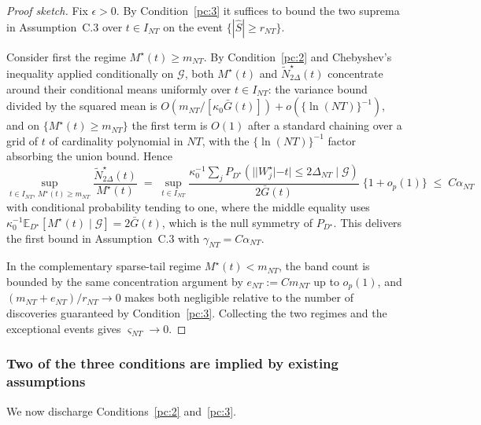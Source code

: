 \begin{proof}[Proof sketch]
Fix $\epsilon > 0$.  By Condition~\ref{pc:3} it suffices to bound the two
suprema in Assumption~C.3 over $t \in I_{NT}$ on the event
$\{|\widehat S| \ge r_{NT}\}$.

Consider first the regime $M^\star(t) \ge m_{NT}$.  By Condition~\ref{pc:2}
and Chebyshev's inequality applied conditionally on $\mathcal{G}$, both
$M^\star(t)$ and $\widetilde N^\star_{2\Delta}(t)$ concentrate around their
conditional means uniformly over $t \in I_{NT}$: the variance bound divided by
the squared mean is $O(m_{NT}/[\kappa_0\bar G(t)]) + o(\{\ln(NT)\}^{-1})$, and
on $\{M^\star(t) \ge m_{NT}\}$ the first term is $O(1)$ after a standard
chaining over a grid of $t$ of cardinality polynomial in $NT$, with the
$\{\ln (NT)\}^{-1}$ factor absorbing the union bound.  Hence
\[
\sup_{t \in I_{NT},\, M^\star(t)\ge m_{NT}}
\frac{\widetilde N^\star_{2\Delta}(t)}{M^\star(t)}
\;=\;
\sup_{t \in I_{NT}}
\frac{\kappa_0^{-1}\sum_{j} P_{D^\star}(||W_j^\star|-t|\le 2\Delta_{NT}\mid\mathcal{G})}
     {2\bar G(t)}\;\{1 + o_p(1)\}
\;\le\; C\alpha_{NT}
\]
with conditional probability tending to one, where the middle equality uses
$\kappa_0^{-1}\mathbb{E}_{D^\star}[M^\star(t)\mid\mathcal{G}] = 2\bar G(t)$,
which is the null symmetry of $P_{D^\star}$.  This delivers the first bound in
Assumption~C.3 with $\gamma_{NT} = C\alpha_{NT}$.

In the complementary sparse-tail regime $M^\star(t) < m_{NT}$, the band count
is bounded by the same concentration argument by
$e_{NT} := C m_{NT}$ up to $o_p(1)$, and $(m_{NT}+e_{NT})/r_{NT} \to 0$ makes
both negligible relative to the number of discoveries guaranteed by
Condition~\ref{pc:3}.  Collecting the two regimes and the exceptional events
gives $\varsigma_{NT} \to 0$.
\end{proof}

\subsubsection*{Two of the three conditions are implied by existing assumptions}

We now discharge Conditions~\ref{pc:2} and~\ref{pc:3}.


